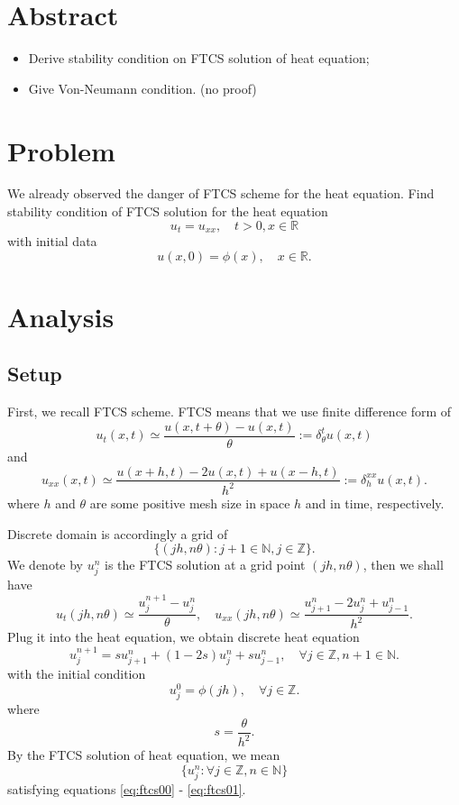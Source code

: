 \documentclass{article}
\begin{document}
\section{Abstract}
\begin{itemize}
 \item Derive stability condition on  FTCS solution of heat equation;
 \item Give Von-Neumann condition. (no proof)
\end{itemize}

\section{Problem}
We already observed the danger of FTCS scheme for the heat equation.
Find stability condition of FTCS solution for the heat equation
$$u_t = u_{xx}, \quad t>0, x\in \mathbb R$$
with initial data
$$
u(x, 0) = \phi(x), \quad x\in \mathbb R.
$$




\section{Analysis}
\subsection{Setup}
First, we recall FTCS scheme. FTCS means that we use finite difference form of
$$u_{t}(x, t) \simeq \frac{u(x, t+ \theta) - u(x, t)}{\theta} := 
\delta^{t}_{\theta} u (x, t)$$
and
$$u_{xx}(x, t) \simeq \frac{u(x+h, t) - 2u(x, t) + u(x-h, t)}{h^{2}}
:= \delta^{xx}_{h} u (x, t).$$
where $h$ and $\theta$ are some positive 
mesh size in space $h$ and in time, respectively. 

Discrete domain is accordingly a grid of
$$\{(jh, n\theta): j +1 \in \mathbb N, j\in \mathbb Z\}.$$
We denote by $u_{j}^{n}$ is the FTCS solution at a grid point $(jh, n\theta)$, 
then we shall have
$$u_{t}(jh, n\theta) \simeq \frac{u_{j}^{n+1} - u_{j}^{n}}{\theta}, 
\quad u_{xx}(jh, n\theta) \simeq 
\frac{u_{j+1}^{n} - 2u_{j}^{n} + u_{j-1}^{n}}{h^{2}}.$$
Plug it into the heat equation, we obtain discrete heat equation 
\begin{equation}
\label{eq:ftcs01}
u_{j}^{n+1} = s u_{j+1}^{n} + (1-2s) u_{j}^{n} + s u_{j-1}^{n}, \quad \forall j\in \mathbb Z, n+1 \in \mathbb N. 
\end{equation}
with the initial condition
\begin{equation}
 \label{eq:ftcs00}
 u_{j}^{0} = \phi(jh), \quad \forall j\in \mathbb Z.
\end{equation}
where 
$$s = \frac{\theta}{h^{2}}.$$
By the FTCS solution of heat equation, we mean 
 $$\{u_{j}^{n}: \forall j\in \mathbb Z, n \in \mathbb N \}$$ 
 satisfying
 equations \eqref{eq:ftcs00} - \eqref{eq:ftcs01}.
\end{document}
